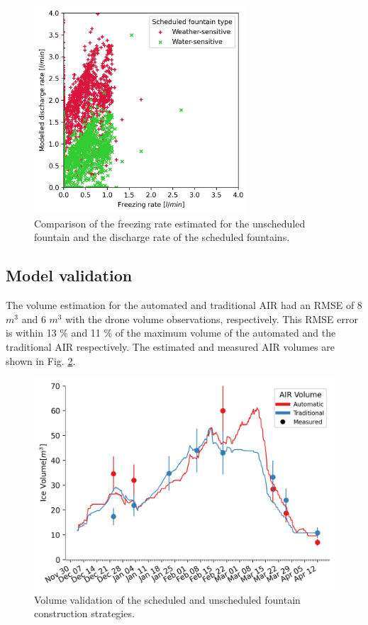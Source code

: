 \documentclass[tc, manuscript]{copernicus}
\begin{document}
\begin{figure}[t]
\includegraphics[width=8cm]{Figures/simvsreal.jpg}

\caption{ Comparison of the freezing rate estimated for the unscheduled fountain and the discharge rate of the
scheduled fountains. }

\label{fig:simvsreal}
\end{figure}

\subsection{Model validation}

The volume estimation for the automated and traditional AIR had an RMSE of 8 $m^3$ and 6 $m^3$ with the drone
volume observations, respectively. This RMSE error is within 13 \% and 11 \% of the maximum volume of the
automated and the traditional AIR respectively. The estimated and measured AIR volumes are shown in Fig.
\ref{fig:validation}.  

\begin{figure}[t] \includegraphics[width=12cm] {Figures/validation.png} \caption{Volume validation of the
scheduled and unscheduled fountain construction strategies.} \label{fig:validation} \end{figure}
\end{document}
